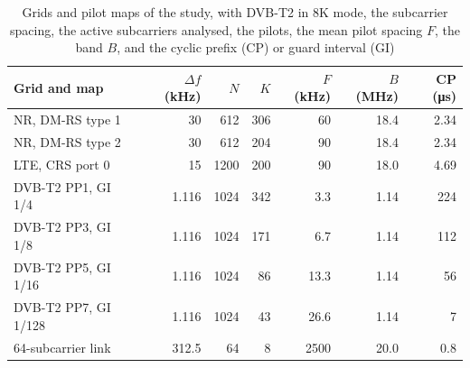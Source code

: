 \begin{table}[t]
\caption{Grids and pilot maps of the study, with DVB-T2 in 8K mode, the subcarrier spacing, the active subcarriers analysed, the pilots, the mean pilot spacing $F$, the band $B$, and the cyclic prefix (CP) or guard interval (GI)}
\label{tab:setup}
\centering
\footnotesize
\setlength{\tabcolsep}{7pt}
\begin{tabular}{lrrrrrr}
\toprule
Grid and map & $\Delta f$ (kHz) & $N$ & $K$ & $F$ (kHz) & $B$ (MHz) & CP (\si{\micro\second}) \\
\midrule
NR, DM-RS type 1 & 30 & 612 & 306 & 60 & 18.4 & 2.34 \\
NR, DM-RS type 2 & 30 & 612 & 204 & 90 & 18.4 & 2.34 \\
LTE, CRS port 0 & 15 & 1200 & 200 & 90 & 18.0 & 4.69 \\
DVB-T2 PP1, GI 1/4 & 1.116 & 1024 & 342 & 3.3 & 1.14 & 224 \\
DVB-T2 PP3, GI 1/8 & 1.116 & 1024 & 171 & 6.7 & 1.14 & 112 \\
DVB-T2 PP5, GI 1/16 & 1.116 & 1024 & 86 & 13.3 & 1.14 & 56 \\
DVB-T2 PP7, GI 1/128 & 1.116 & 1024 & 43 & 26.6 & 1.14 & 7 \\
64-subcarrier link & 312.5 & 64 & 8 & 2500 & 20.0 & 0.8 \\
\bottomrule
\end{tabular}
\end{table}
